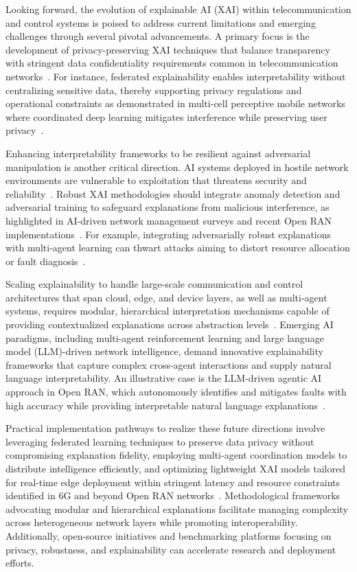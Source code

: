 \documentclass[sigconf]{acmart}
\begin{document}
Looking forward, the evolution of explainable AI (XAI) within telecommunication and control systems is poised to address current limitations and emerging challenges through several pivotal advancements. A primary focus is the development of privacy-preserving XAI techniques that balance transparency with stringent data confidentiality requirements common in telecommunication networks~\cite{ref48}. For instance, federated explainability enables interpretability without centralizing sensitive data, thereby supporting privacy regulations and operational constraints as demonstrated in multi-cell perceptive mobile networks where coordinated deep learning mitigates interference while preserving user privacy~\cite{ref48}. 

Enhancing interpretability frameworks to be resilient against adversarial manipulation is another critical direction. AI systems deployed in hostile network environments are vulnerable to exploitation that threatens security and reliability~\cite{ref50}. Robust XAI methodologies should integrate anomaly detection and adversarial training to safeguard explanations from malicious interference, as highlighted in AI-driven network management surveys and recent Open RAN implementations~\cite{ref54}. For example, integrating adversarially robust explanations with multi-agent learning can thwart attacks aiming to distort resource allocation or fault diagnosis~\cite{ref50, ref54}.

Scaling explainability to handle large-scale communication and control architectures that span cloud, edge, and device layers, as well as multi-agent systems, requires modular, hierarchical interpretation mechanisms capable of providing contextualized explanations across abstraction levels~\cite{ref55}. Emerging AI paradigms, including multi-agent reinforcement learning and large language model (LLM)-driven network intelligence, demand innovative explainability frameworks that capture complex cross-agent interactions and supply natural language interpretability. An illustrative case is the LLM-driven agentic AI approach in Open RAN, which autonomously identifies and mitigates faults with high accuracy while providing interpretable natural language explanations~\cite{ref55}.

Practical implementation pathways to realize these future directions involve leveraging federated learning techniques to preserve data privacy without compromising explanation fidelity, employing multi-agent coordination models to distribute intelligence efficiently, and optimizing lightweight XAI models tailored for real-time edge deployment within stringent latency and resource constraints identified in 6G and beyond Open RAN networks~\cite{ref54}. Methodological frameworks advocating modular and hierarchical explanations facilitate managing complexity across heterogeneous network layers while promoting interoperability. Additionally, open-source initiatives and benchmarking platforms focusing on privacy, robustness, and explainability can accelerate research and deployment efforts.
\end{document}
